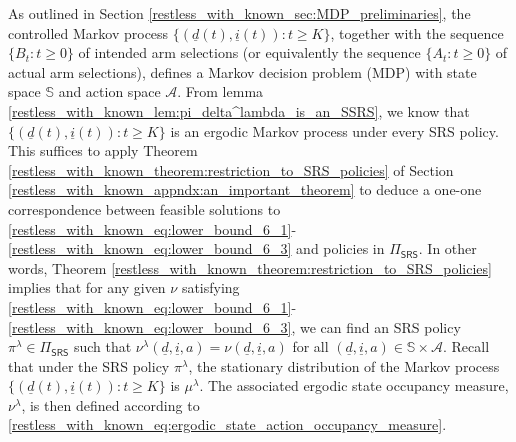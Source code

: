 As outlined in Section \ref{restless_with_known_sec:MDP_preliminaries}, the controlled Markov process $\{(\underline{d}(t),\underline{i}(t)):t\geq K\}$, together with the sequence $\{B_t:t\geq 0\}$ of intended arm selections (or equivalently the sequence $\{A_t:t\geq 0\}$ of actual arm selections), defines a Markov decision problem (MDP) with state space $\mathbb{S}$ and action space $\mathcal{A}$. From lemma \ref{restless_with_known_lem:pi_delta^lambda_is_an_SSRS}, we know that $\{(\underline{d}(t), \underline{i}(t)): t\geq K\}$ is an ergodic Markov process under every SRS policy. This suffices to apply  Theorem \ref{restless_with_known_theorem:restriction_to_SRS_policies} of Section \ref{restless_with_known_appndx:an_important_theorem} to deduce a one-one correspondence between feasible solutions to \eqref{restless_with_known_eq:lower_bound_6_1}-\eqref{restless_with_known_eq:lower_bound_6_3} and policies in $\Pi_{\textsf{SRS}}$. In other words,  Theorem \ref{restless_with_known_theorem:restriction_to_SRS_policies} implies that for any given $\nu$ satisfying \eqref{restless_with_known_eq:lower_bound_6_1}-\eqref{restless_with_known_eq:lower_bound_6_3}, we can find an SRS policy $\pi^\lambda\in\Pi_{\textsf{SRS}}$ such that $\nu^\lambda(\underline{d},\underline{i},a)=\nu(\underline{d},\underline{i},a)$ for all $(\underline{d},\underline{i},a)\in\mathbb{S}\times\mathcal{A}$. Recall that under the SRS policy $\pi^\lambda$, the stationary distribution of the Markov process $\{(\underline{d}(t),\underline{i}(t)):t\geq K\}$ is $\mu^\lambda$. The associated ergodic state occupancy measure, $\nu^\lambda$, is then defined according to \eqref{restless_with_known_eq:ergodic_state_action_occupancy_measure}.

